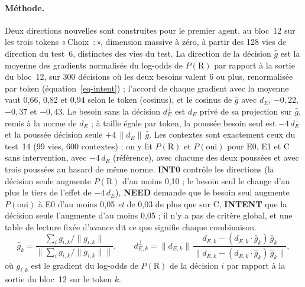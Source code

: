 \documentclass[11pt,a4paper]{article}
\newcommand{\Choix}{«\,Choix~:\,»}
\newcommand{\dE}{d_{E}}
\begin{document}
\paragraph{Méthode.} Deux directions nouvelles sont construites pour le premier agent, au
bloc~12 sur les trois tokens \Choix{}, dimension massive à zéro, à partir des 128 vies de
direction du test~6, distinctes des vies du test. La direction de la décision $\hat g$ est
la moyenne des gradients normalisés du log-odds de $P(\mathrm R)$ par rapport à la sortie
du bloc~12, sur 300 décisions où les deux besoins valent 6 ou plus, renormalisée par token
(équation~\eqref{eq-intent}) ; l'accord de chaque gradient avec la moyenne vaut 0,66, 0,82
et 0,94 selon le token (cosinus), et le cosinus de $\hat g$ avec $\dE$, $-0,22$, $-0,37$ et
$-0,43$. Le besoin sans la décision $\dE^{\perp}$ est $\dE$ privé de sa projection sur
$\hat g$, remis à la norme de $\dE$ ; à taille égale par token, la poussée \og besoin
seul \fg{} est $-4\,\dE^{\perp}$ et la poussée \og décision seule \fg{}
$+4\,\lVert\dE\rVert\,\hat g$. Les contextes sont exactement ceux du test~14 (99 vies,
600 contextes) ; on y lit $P(\mathrm R)$ et $P(\text{oui})$ pour E0, E1 et C sans
intervention, avec $-4\,\dE$ (référence), avec chacune des deux poussées et avec trois
poussées au hasard de même norme. \textbf{INT0} contrôle les directions (la décision seule
augmente $P(\mathrm R)$ d'au moins 0,10 ; le besoin seul le change d'au plus le tiers de
l'effet de $-4\,\dE$), \textbf{NEED} demande que le besoin seul augmente $P(\text{oui})$ à
E0 d'au moins 0,05 \emph{et} de 0,03 de plus que sur C, \textbf{INTENT} que la décision
seule l'augmente d'au moins 0,05 ; il n'y a pas de critère global, et une table de lecture
fixée d'avance dit ce que signifie chaque combinaison.
\begin{equation}
\hat g_k=\frac{\sum_i g_{i,k}/\lVert g_{i,k}\rVert}{\bigl\lVert\sum_i g_{i,k}/\lVert g_{i,k}\rVert\bigr\rVert},
\qquad
d^{\perp}_{E,k}=\lVert d_{E,k}\rVert\,
\frac{d_{E,k}-(d_{E,k}\cdot\hat g_k)\,\hat g_k}{\bigl\lVert d_{E,k}-(d_{E,k}\cdot\hat g_k)\,\hat g_k\bigr\rVert},
\label{eq-intent}
\end{equation}
où $g_{i,k}$ est le gradient du log-odds de $P(\mathrm R)$ de la décision $i$ par rapport
à la sortie du bloc~12 sur le token $k$.
\end{document}
